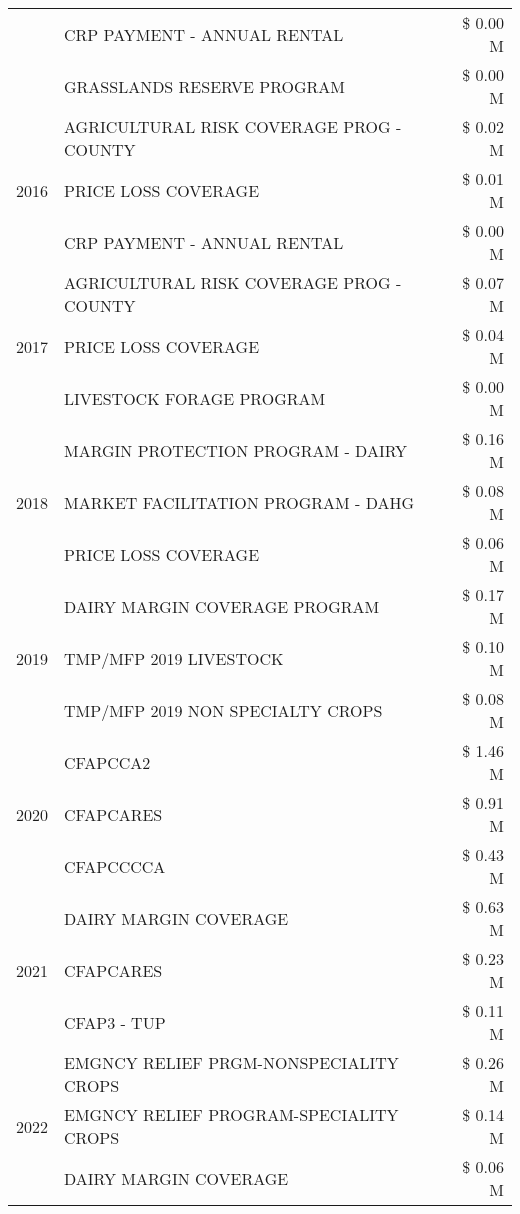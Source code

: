 \begin{tabular}{llr}
 & CRP PAYMENT - ANNUAL RENTAL & \$ 0.00 M \\
 & GRASSLANDS RESERVE PROGRAM & \$ 0.00 M \\
\cline{1-3}
\multirow[t]{3}{*}{2016} & AGRICULTURAL RISK COVERAGE PROG - COUNTY & \$ 0.02 M \\
 & PRICE LOSS COVERAGE & \$ 0.01 M \\
 & CRP PAYMENT - ANNUAL RENTAL & \$ 0.00 M \\
\cline{1-3}
\multirow[t]{3}{*}{2017} & AGRICULTURAL RISK COVERAGE PROG - COUNTY & \$ 0.07 M \\
 & PRICE LOSS COVERAGE & \$ 0.04 M \\
 & LIVESTOCK FORAGE PROGRAM & \$ 0.00 M \\
\cline{1-3}
\multirow[t]{3}{*}{2018} & MARGIN PROTECTION PROGRAM - DAIRY & \$ 0.16 M \\
 & MARKET FACILITATION PROGRAM - DAHG & \$ 0.08 M \\
 & PRICE LOSS COVERAGE & \$ 0.06 M \\
\cline{1-3}
\multirow[t]{3}{*}{2019} & DAIRY MARGIN COVERAGE PROGRAM & \$ 0.17 M \\
 & TMP/MFP 2019 LIVESTOCK & \$ 0.10 M \\
 & TMP/MFP 2019 NON SPECIALTY CROPS & \$ 0.08 M \\
\cline{1-3}
\multirow[t]{3}{*}{2020} & CFAPCCA2 & \$ 1.46 M \\
 & CFAPCARES & \$ 0.91 M \\
 & CFAPCCCCA & \$ 0.43 M \\
\cline{1-3}
\multirow[t]{3}{*}{2021} & DAIRY MARGIN COVERAGE & \$ 0.63 M \\
 & CFAPCARES & \$ 0.23 M \\
 & CFAP3 - TUP & \$ 0.11 M \\
\cline{1-3}
\multirow[t]{3}{*}{2022} & EMGNCY RELIEF PRGM-NONSPECIALITY CROPS & \$ 0.26 M \\
 & EMGNCY RELIEF PROGRAM-SPECIALITY CROPS & \$ 0.14 M \\
 & DAIRY MARGIN COVERAGE & \$ 0.06 M \\
\cline{1-3}
\bottomrule
\end{tabular}
